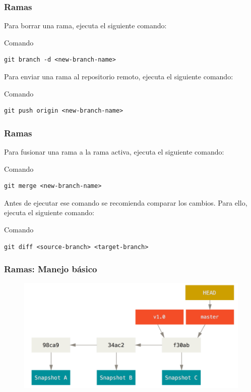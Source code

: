 \documentclass{beamer}
\begin{document}
\begin{frame}[fragile]
\frametitle{Ramas}
Para borrar una rama, ejecuta el siguiente comando:
\begin{block}{Comando}
\begin{verbatim}
git branch -d <new-branch-name>
\end{verbatim}
\end{block}
\vskip 0.50cm
Para enviar una rama al repositorio remoto, ejecuta el siguiente comando:
\begin{block}{Comando}
\begin{verbatim}
git push origin <new-branch-name>
\end{verbatim}
\end{block}
\end{frame}

\begin{frame}[fragile]
\frametitle{Ramas}
Para fusionar una rama a la rama activa, ejecuta el siguiente comando:
\begin{block}{Comando}
\begin{verbatim}
git merge <new-branch-name>
\end{verbatim}
\end{block}
\vskip 0.50cm
Antes de ejecutar ese comando se recomienda comparar los cambios. Para ello, ejecuta el siguiente comando:
\begin{block}{Comando}
\begin{verbatim}
git diff <source-branch> <target-branch>
\end{verbatim}
\end{block}
\end{frame}

\begin{frame}
\frametitle{Ramas: Manejo básico}
\begin{figure}
\includegraphics[width=0.85\linewidth]{img/branching-0.png}
\end{figure}
\end{frame}
\end{document}
